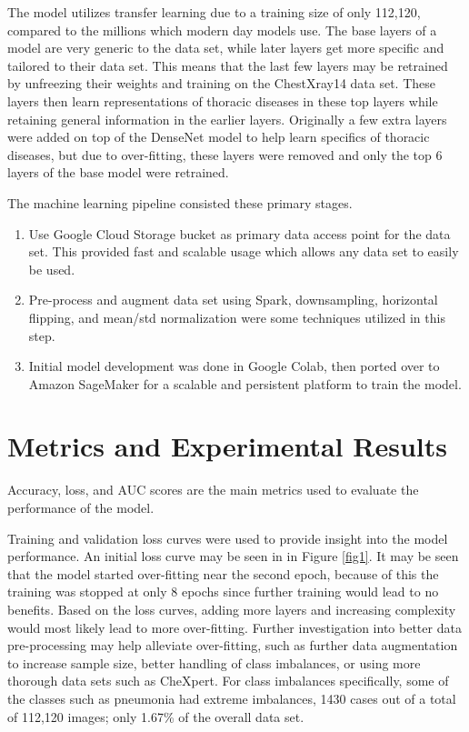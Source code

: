 \documentclass{amia}
\begin{document}
The model utilizes transfer learning due to a training size of only 112,120, compared to the millions which modern day models use. The base layers of a model are very generic to the data set, while later layers get more specific and tailored to their data set. This means that the last few layers may be retrained by unfreezing their weights and training on the ChestXray14 data set. These layers then learn representations of thoracic diseases in these top layers while retaining general information in the earlier layers. Originally a few extra layers were added on top of the DenseNet model to help learn specifics of thoracic diseases, but due to over-fitting, these layers were removed and only the top 6 layers of the base model were retrained.

The machine learning pipeline consisted these primary stages.
\begin{enumerate}
  \item Use Google Cloud Storage bucket as primary data access point for the data set. This provided fast and scalable usage which allows any data set to easily be used.
  \item Pre-process and augment data set using Spark, downsampling, horizontal flipping, and mean/std normalization were some techniques utilized in this step.
  \item Initial model development was done in Google Colab, then ported over to Amazon SageMaker for a scalable and persistent platform to train the model.
\end{enumerate}

\section*{Metrics and Experimental Results}
Accuracy, loss, and AUC scores are the main metrics used to evaluate the performance of the model.


Training and validation loss curves were used to provide insight into the model performance. An initial loss curve may be seen in in Figure \ref{fig1}. It may be seen that the model started over-fitting near the second epoch, because of this the training was stopped at only 8 epochs since further training would lead to no benefits. Based on the loss curves, adding more layers and increasing complexity would most likely lead to more over-fitting. Further investigation into better data pre-processing may help alleviate over-fitting, such as further data augmentation to increase sample size, better handling of class imbalances, or using more thorough data sets such as CheXpert. For class imbalances specifically, some of the classes such as pneumonia had extreme imbalances, 1430  cases  out  of  a total of 112,120 images;  only 1.67\% of the overall data set.
\end{document}
